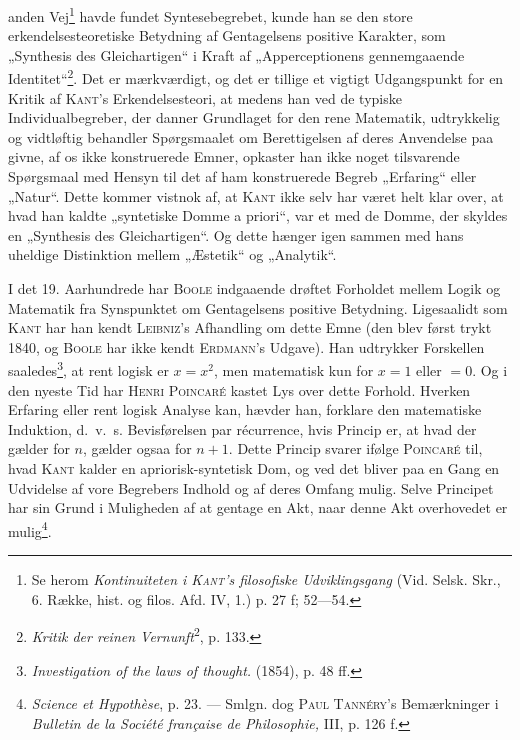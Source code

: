 \documentclass[12pt]{article}
\newcommand{\opage}[1]{\marginnote{\footnotesize\textit{[#1]}}}
\begin{document}
anden Vej\footnote{Se herom \textit{Kontinuiteten i \textsc{Kant}'s
filosofiske Udviklingsgang} (Vid. Selsk. Skr., 6. Række, hist. og filos.
Afd. IV, 1.) p. 27 f; 52---54.} havde fundet Syntesebegrebet, kunde han se den
store erkendelsesteoretiske Betydning af Gentagelsens positive Karakter, som
„Synthesis des Gleichartigen“ i Kraft af „Apperceptionens gennemgaaende
Identitet“\footnote{\textit{Kritik der reinen Vernunft}\textsuperscript{2},
p. 133.}. Det er mærkværdigt, og det er tillige et vigtigt Udgangspunkt for en
Kritik af \textsc{Kant}'s Erkendelsesteori, at medens han ved de typiske
Individualbegreber, der danner Grundlaget
\setcounter{footnote}{0}%
\opage{37}for den rene Matematik, udtrykkelig og vidtløftig behandler
Spørgsmaalet om Berettigelsen af deres Anvendelse paa givne, af os ikke
konstruerede Emner, opkaster han ikke noget tilsvarende Spørgsmaal med Hensyn
til det af ham konstruerede Begreb „Erfaring“ eller „Natur“. Dette kommer
vistnok af, at \textsc{Kant} ikke selv har været helt klar over, at hvad han
kaldte „syntetiske Domme a priori“, var et med de Domme, der skyldes en
„Synthesis des Gleichartigen“. Og dette hænger igen sammen med hans uheldige
Distinktion mellem „Æstetik“ og „Analytik“.

I det 19. Aarhundrede har \textsc{Boole} indgaaende drøftet Forholdet mellem
Logik og Matematik fra Synspunktet om Gentagelsens positive Betydning.
Ligesaalidt som \textsc{Kant} har han kendt \textsc{Leibniz}'s Afhandling om
dette Emne (den blev først trykt 1840, og \textsc{Boole} har ikke kendt
\textsc{Erdmann}'s Udgave). Han udtrykker Forskellen
saaledes\footnote{\textit{Investigation of the laws of thought.} (1854), p. 48
ff.}, at rent logisk er $x = x^2$, men matematisk kun for $x = 1$ eller $= 0$.
Og i den nyeste Tid har \textsc{Henri Poincaré} kastet Lys over dette
Forhold. Hverken Erfaring eller rent logisk Analyse kan, hævder han, forklare
den matematiske Induktion, d.~v.~s. Bevisførelsen par récurrence, hvis Princip
er, at hvad der gælder for $n$, gælder ogsaa for $n + 1$. Dette Princip svarer
ifølge \textsc{Poincaré} til, hvad \textsc{Kant} kalder en
apriorisk-syntetisk Dom, og ved det bliver paa en Gang en Udvidelse af vore
Begrebers Indhold og af deres Omfang mulig. Selve Principet har sin Grund i
Muligheden af at gentage en Akt, naar denne Akt overhovedet er
mulig\footnote{\textit{Science et Hypothèse}, p. 23. --- Smlgn. dog
\textsc{Paul Tannéry}'s Bemærkninger i \textit{Bulletin de la Société
française de Philosophie,} III, p. 126 f.}.
\end{document}
